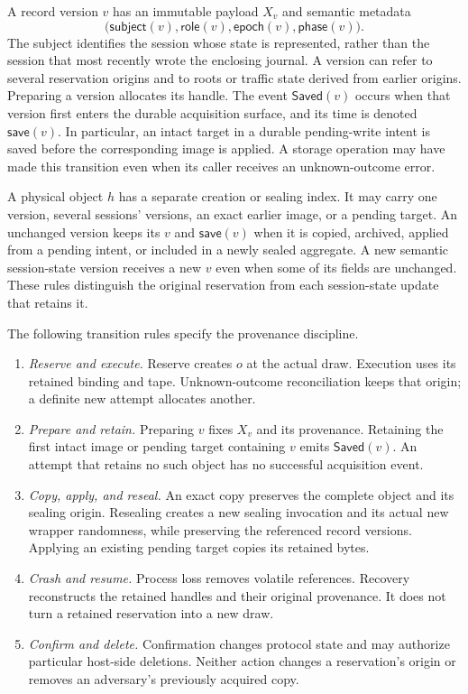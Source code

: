 A record version $v$ has an immutable payload $X_v$ and semantic metadata
\[
  \bigl(\mathsf{subject}(v),\mathsf{role}(v),
         \mathsf{epoch}(v),\mathsf{phase}(v)\bigr).
\]
The subject identifies the session whose state is represented, rather than
the session that most recently wrote the enclosing journal.  A version can
refer to several reservation origins and to roots or traffic state derived
from earlier origins.  Preparing a version allocates its handle.  The event
$\mathsf{Saved}(v)$ occurs when that version first enters the durable
acquisition surface, and its time is denoted $\mathsf{save}(v)$.  In particular,
an intact target in a durable pending-write intent is saved before the
corresponding image is applied.  A storage operation may have made this
transition even when its caller receives an unknown-outcome error.

A physical object $h$ has a separate creation or sealing index.  It may carry
one version, several sessions' versions, an exact earlier image, or a pending
target.  An unchanged version keeps its $v$ and $\mathsf{save}(v)$ when it is
copied, archived, applied from a pending intent, or included in a newly sealed
aggregate.  A new semantic session-state version receives a new $v$ even when
some of its fields are unchanged.  These rules distinguish the original
reservation from each session-state update that retains it.

The following transition rules specify the provenance discipline.

\begin{enumerate}
  \item \emph{Reserve and execute.}  Reserve creates $o$ at the actual draw.
  Execution uses its retained binding and tape.  Unknown-outcome
  reconciliation keeps that origin; a definite new attempt allocates another.
  \item \emph{Prepare and retain.}  Preparing $v$ fixes $X_v$ and its provenance.
  Retaining the first intact image or pending target containing $v$ emits
  $\mathsf{Saved}(v)$.  An attempt that retains no such object has no successful
  acquisition event.
  \item \emph{Copy, apply, and reseal.}  An exact copy preserves the complete
  object and its sealing origin.  Resealing creates a new sealing invocation
  and its actual new wrapper randomness, while preserving the referenced
  record versions.  Applying an existing pending target copies its retained
  bytes.
  \item \emph{Crash and resume.}  Process loss removes volatile references.
  Recovery reconstructs the retained handles and their original provenance.
  It does not turn a retained reservation into a new draw.
  \item \emph{Confirm and delete.}  Confirmation changes protocol state and may
  authorize particular host-side deletions.  Neither action changes a
  reservation's origin or removes an adversary's previously acquired copy.
\end{enumerate}

